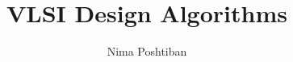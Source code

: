 \documentclass[12pt]{article}
\title{VLSI Design Algorithms}
\author{Nima Poshtiban}
\date{\displaydate{date}}
\begin{document}
\maketitle
\pagebreak
\tableofcontents





\end{document}
